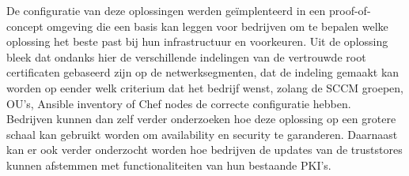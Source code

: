 De configuratie van deze oplossingen werden geïmplenteerd in een proof-of-concept omgeving die een basis kan leggen voor bedrijven om te bepalen welke oplossing het beste past bij hun infrastructuur en voorkeuren.
Uit de oplossing bleek dat ondanks hier de verschillende indelingen van de vertrouwde root certificaten gebaseerd zijn op de netwerksegmenten, dat de indeling gemaakt kan worden op eender welk criterium dat het bedrijf wenst, zolang de SCCM groepen, OU's, Ansible inventory of Chef nodes de correcte configuratie hebben. \\

Bedrijven kunnen dan zelf verder onderzoeken hoe deze oplossing op een grotere schaal kan gebruikt worden om availability en security te garanderen. Daarnaast kan er ook verder onderzocht worden hoe bedrijven de updates van de truststores kunnen afstemmen met functionaliteiten van hun bestaande PKI's.